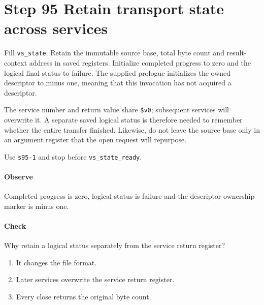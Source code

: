 \section{Step 95 Retain transport state across services}
Fill \texttt{vs\_state}. Retain the immutable source base, total byte count and result-context address in saved registers. Initialize completed progress to zero and the logical final status to failure. The supplied prologue initializes the owned descriptor to minus one, meaning that this invocation has not acquired a descriptor.

The service number and return value share \texttt{\$v0}; subsequent services will overwrite it. A separate saved logical status is therefore needed to remember whether the entire transfer finished. Likewise, do not leave the source base only in an argument register that the open request will repurpose.

Use \texttt{s95-1} and stop before \texttt{vs\_state\_ready}.

\paragraph{Observe} Completed progress is zero, logical status is failure and the descriptor ownership marker is minus one.

\paragraph{Check} Why retain a logical status separately from the service return register?
\begin{enumerate}[label=\Alph*.]
  \item It changes the file format.
  \item Later services overwrite the service return register.
  \item Every close returns the original byte count.
\end{enumerate}
